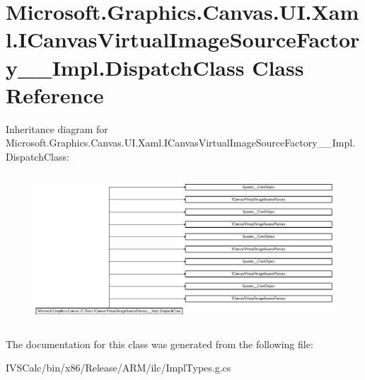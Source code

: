\hypertarget{class_microsoft_1_1_graphics_1_1_canvas_1_1_u_i_1_1_xaml_1_1_i_canvas_virtual_image_source_factory_____impl_1_1_dispatch_class}{}\section{Microsoft.\+Graphics.\+Canvas.\+U\+I.\+Xaml.\+I\+Canvas\+Virtual\+Image\+Source\+Factory\+\_\+\+\_\+\+Impl.\+Dispatch\+Class Class Reference}
\label{class_microsoft_1_1_graphics_1_1_canvas_1_1_u_i_1_1_xaml_1_1_i_canvas_virtual_image_source_factory_____impl_1_1_dispatch_class}
Inheritance diagram for Microsoft.\+Graphics.\+Canvas.\+U\+I.\+Xaml.\+I\+Canvas\+Virtual\+Image\+Source\+Factory\+\_\+\+\_\+\+Impl.\+Dispatch\+Class\+:\begin{figure}[H]
\begin{center}
\leavevmode
\includegraphics[height=5.630713cm]{class_microsoft_1_1_graphics_1_1_canvas_1_1_u_i_1_1_xaml_1_1_i_canvas_virtual_image_source_factory_____impl_1_1_dispatch_class}
\end{center}
\end{figure}


The documentation for this class was generated from the following file\+:\begin{DoxyCompactItemize}
\item 
I\+V\+S\+Calc/bin/x86/\+Release/\+A\+R\+M/ilc/Impl\+Types.\+g.\+cs\end{DoxyCompactItemize}
